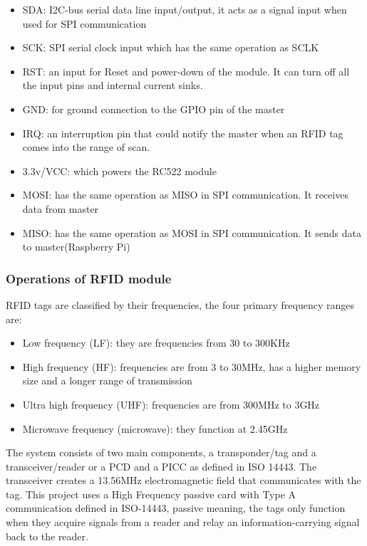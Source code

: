 \begin{itemize}
\item SDA: \gls{I2C}-bus serial data line input/output, it acts as a signal input when used for \gls{SPI} communication
\item SCK: \gls{SPI} serial clock input which has the same operation as SCLK
\item RST: an input for Reset and power-down of the module. It can turn off all the input pins and internal current sinks.
\item GND: for ground connection to the \gls{GPIO} pin of the master
\item IRQ: an interruption pin that could notify the master when an \gls{RFID} tag comes into the range of scan.
\item 3.3v/VCC: which powers the RC522 module
\item MOSI: has the same operation as MISO in \gls{SPI} communication. It receives data from master
\item MISO: has the same operation as MOSI in \gls{SPI} communication. It sends data to master(Raspberry Pi)
\end{itemize}
\subsubsection{Operations of \gls{RFID} module}
\gls{RFID} tags are classified by their frequencies, the four primary frequency ranges are:
\begin{itemize}
\item Low frequency (LF): they are frequencies from 30 to 300KHz
\item High frequency (HF): frequencies are from 3 to 30MHz, has a higher memory size and a longer range of transmission
\item Ultra high frequency (UHF): frequencies are from 300MHz to 3GHz
\item Microwave frequency (microwave): they function at 2.45GHz
\end{itemize}
The system consists of two main components, a transponder/tag and a transceiver/reader or a \gls{PCD} and a \gls{PICC} as defined in ISO 14443. The transceiver creates a 13.56MHz electromagnetic field that communicates with the tag.
This project uses a High Frequency passive card with Type A communication defined in ISO-14443, passive meaning, the tags only function when they acquire signals from a reader and relay an information-carrying signal back to the reader.
